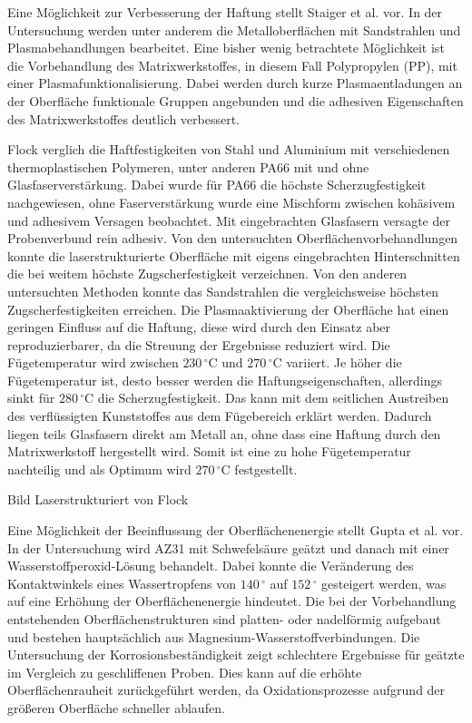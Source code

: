 Eine Möglichkeit zur Verbesserung der Haftung stellt Staiger et al. \cite{Staiger.2014} vor.
In der Untersuchung werden unter anderem die Metalloberflächen mit Sandstrahlen und Plasmabehandlungen bearbeitet.
Eine bisher wenig betrachtete Möglichkeit ist die Vorbehandlung des Matrixwerkstoffes, in diesem Fall Polypropylen (PP), mit einer Plasmafunktionalisierung.
Dabei werden durch kurze Plasmaentladungen an der Oberfläche funktionale Gruppen angebunden und die adhesiven Eigenschaften des Matrixwerkstoffes deutlich verbessert.

Flock \cite{Flock.b} verglich die Haftfestigkeiten von Stahl und Aluminium mit verschiedenen thermoplastischen Polymeren, unter anderen PA66 mit und ohne Glasfaserverstärkung.
Dabei wurde für PA66 die höchste Scherzugfestigkeit nachgewiesen, ohne Faserverstärkung wurde eine Mischform zwischen kohäsivem und adhesivem Versagen beobachtet.
Mit eingebrachten Glasfasern versagte der Probenverbund rein adhesiv.
Von den untersuchten Oberflächenvorbehandlungen konnte die laserstrukturierte Oberfläche mit eigens eingebrachten Hinterschnitten die bei weitem höchste Zugscherfestigkeit verzeichnen.
Von den anderen untersuchten Methoden konnte das Sandstrahlen die vergleichsweise höchsten Zugscherfestigkeiten erreichen.
Die Plasmaaktivierung der Oberfläche hat einen geringen Einfluss auf die Haftung, diese wird durch den Einsatz aber reproduzierbarer, da die Streuung der Ergebnisse reduziert wird.
Die Fügetemperatur wird zwischen $230 \, ^\circ \text{C}$ und $270 \, ^\circ \text{C}$ variiert.
Je höher die Fügetemperatur ist, desto besser werden die Haftungseigenschaften, allerdings sinkt für $280 \, ^\circ \text{C}$ die Scherzugfestigkeit.
Das kann mit dem seitlichen Austreiben des verflüssigten Kunststoffes aus dem Fügebereich erklärt werden.
Dadurch liegen teils Glasfasern direkt am Metall an, ohne dass eine Haftung durch den Matrixwerkstoff hergestellt wird.
Somit ist eine zu hohe Fügetemperatur nachteilig und als Optimum wird $270 \, ^\circ \text{C}$ festgestellt.

Bild Laserstrukturiert von Flock

Eine Möglichkeit der Beeinflussung der Oberflächenenergie stellt Gupta et al. \cite{Gupta.2012} vor.
In der Untersuchung wird AZ31 mit Schwefelsäure geätzt und danach mit einer Wasserstoffperoxid-Lösung behandelt.
Dabei konnte die Veränderung des Kontaktwinkels eines Wassertropfens von $140\, ^\circ$ auf $152 \, ^\circ$ gesteigert werden, was auf eine Erhöhung der Oberflächenenergie hindeutet.
Die bei der Vorbehandlung entstehenden Oberflächenstrukturen sind platten- oder nadelförmig aufgebaut und bestehen hauptsächlich aus Magnesium-Wasserstoffverbindungen.
Die Untersuchung der Korrosionsbeständigkeit zeigt schlechtere Ergebnisse für geätzte im Vergleich zu geschliffenen Proben.
Dies kann auf die erhöhte Oberflächenrauheit zurückgeführt werden, da Oxidationsprozesse aufgrund der größeren Oberfläche schneller ablaufen.

